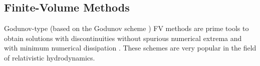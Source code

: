 \subsection{Finite-Volume Methods}


Godunov-type (based on the Godunov scheme \citep{Godunov:1959}) \ac{FV} methods 
are prime tools to obtain solutions with discontinuities without spurious numerical extrema and with minimum numerical dissipation \citep{Toro:1999}.
These schemes are very popular in the field of relativistic hydrodynamics. 

